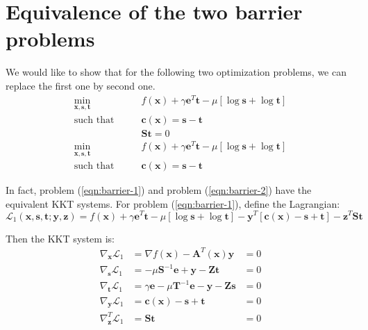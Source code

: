 \documentclass[12pt]{article}
\newcommand{\mb}{\mathbf}
\begin{document}
\section{Equivalence of the two barrier problems}
\label{section:proof}
We would like to show that for the following two optimization problems, we can replace the first one by second one.
%
\begin{equation}
  \label{eqn:barrier-1}
  \begin{aligned}
    \min_{\mb{x}, \mb{s}, \mb{t}} \qquad & f(\mb{x}) + \gamma \mb{e}^T \mb{t} - \mu [\log \mb{s} + \log \mb{t} ] \\
    \text{such that} \qquad
    & \mb{c}(\mb{x}) = \mb{s} - \mb{t} \\
    & \mb{S} \mb{t} = 0
  \end{aligned}
\end{equation}
%
\begin{equation}
  \label{eqn:barrier-2}
  \begin{aligned}
    \min_{\mb{x}, \mb{s}, \mb{t}} \qquad & f(\mb{x}) + \gamma \mb{e}^T \mb{t} - \mu [\log \mb{s} + \log \mb{t} ] \\
    \text{such that} \qquad
    & \mb{c}(\mb{x}) = \mb{s} - \mb{t}
  \end{aligned}
\end{equation}

In fact, problem (\ref{eqn:barrier-1}) and problem (\ref{eqn:barrier-2}) have the equivalent KKT systems. For problem (\ref{eqn:barrier-1}), define the Lagrangian:
%
\begin{equation}
\mathcal{L}_1(\mb{x}, \mb{s}, \mb{t}; \mb{y}, \mb{z}) = f(\mb{x}) + \gamma \mb{e}^T \mb{t} - \mu [\log \mb{s} + \log \mb{t} ] - \mb{y}^T [\mb{c}(\mb{x}) - \mb{s} + \mb{t}] - \mb{z}^T \mb{S} \mb{t}
\end{equation}

Then the KKT system is:
%
\begin{equation}
  \label{eqn:KKT-1}
  \begin{aligned}
    \nabla_\mb{x}\mathcal{L}_1 &= \nabla f(\mb{x}) - \mb{A}^T(\mb{x}) \mb{y} &= 0\\
    \nabla_\mb{s}\mathcal{L}_1 &= - \mu \mb{S}^{-1}\mb{e} + \mb{y} - \mb{Z} \mb{t} &=  0\\
    \nabla_\mb{t}\mathcal{L}_1 &= \gamma \mb{e} - \mu \mb{T}^{-1} \mb{e} - \mb{y} - \mb{Z} \mb{s} &= 0 \\
    \nabla_\mb{y}\mathcal{L}_1 &= \mb{c}(\mb{x}) - \mb{s} + \mb{t} &= 0\\
    \nabla_\mb{z}^T\mathcal{L}_1 &= \mb{S} \mb{t} &= 0
  \end{aligned}
\end{equation}
\end{document}
